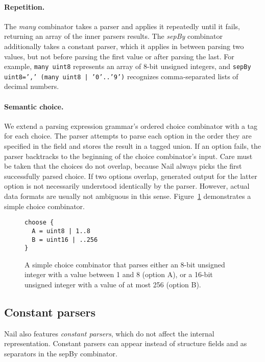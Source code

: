 \paragraph{Repetition.}

The \emph{many} combinator takes a parser and applies it repeatedly
until it fails, returning an array of the inner parsers results. The
\emph{sepBy} combinator
additionally takes a constant parser, which it applies in between parsing
two values, but not before parsing the first value or after parsing the
last.
For example, \texttt{many uint8} represents an array of 8-bit unsigned
integers, and \texttt{sepBy uint8=',' (many uint8 | '0'..'9')} recognizes
comma-separated lists of decimal numbers.


\paragraph{Semantic choice.}

We extend a parsing expression grammar's ordered choice combinator with
a tag for each choice. The parser
attempts to parse each option in the order they are specified in the field and
stores the result in a tagged union. If an option fails, the parser backtracks
to the beginning of the choice combinator's input. Care must be taken that the
choices do not overlap, because Nail always picks the first successfully
parsed choice. If two options overlap, generated output for the latter option is
not necessarily understood identically by the parser. However, actual data
formats are usually not ambiguous in this sense.
Figure~\ref{fig:choice} demonstrates a simple choice combinator.

\begin{figure}[tb]
\begin{verbatim}
choose {
  A = uint8 | 1..8
  B = uint16 | ..256
}
\end{verbatim}
\caption{A simple choice combinator that parses either an 8-bit unsigned
integer with a value between 1 and 8 (option A), or a 16-bit unsigned
integer with a value of at most 256 (option B).}
\label{fig:choice}
\end{figure}

\subsection{Constant parsers}

Nail also features \emph{constant parsers}, which do not affect the internal
representation. Constant parsers can appear instead of structure fields and as
separators in the sepBy combinator.

